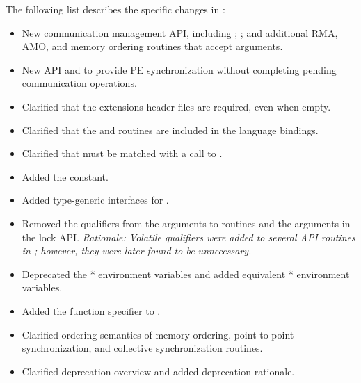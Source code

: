 The following list describes the specific changes in \openshmem[1.4]:
\begin{itemize}
%
\item New communication management \ac{API}, including ;
    ; and additional \ac{RMA}, \ac{AMO}, and memory ordering
    routines that accept  arguments.
%
%
\item New \ac{API}  and  to provide \ac{PE}
    synchronization without completing pending communication operations.
%
%
\item Clarified that the \openshmem extensions header files are required, even when empty.
%
%
\item Clarified that the  and 
    routines are included in the \Fortran language bindings.
%
%
\item Clarified that  must be matched with a call to
    .
%
%
\item Added the  constant.
%
%
\item Added type-generic interfaces for .
%
%
\item Removed the  qualifiers from the  arguments to
 routines and the  arguments in the lock \ac{API}.
\emph{Rationale: Volatile qualifiers were added to several \ac{API} routines in
\openshmem[1.3]; however, they were later found to be unnecessary.}
%
%
\item Deprecated the * environment variables and added equivalent
* environment variables.
%
%
\item Added the \Cstd[11]  function specifier to
.
%
%
\item Clarified ordering semantics of memory ordering, point-to-point synchronization, and collective
synchronization routines.
%
\item Clarified deprecation overview and added deprecation rationale.

\end{itemize}
